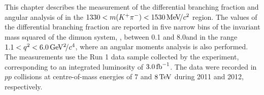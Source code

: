 This chapter describes the measurement of the differential branching fraction and angular analysis of \BdToKpimm in the $1330<m({{K}^+}{{\pi}^-})<1530{\mathrm{\,Me\kern -0.1em V\!/}c^2}$ region. The values of the differential branching fraction are reported in five narrow bins of the invariant mass squared of the dimuon system, \qsq, between 0.1 and 8.0\gevgevcccc and in the range $1.1<{q^2}<6.0{\mathrm{\,Ge\kern -0.1em V^2\!/}c^4}$,  where an angular moments analysis is also performed. The measurements use the Run 1 data sample collected by the \lhcb experiment, corresponding to an integrated luminosity of $3.0\mbox{\,fb}^{-1}$. The data were recorded in $pp$ collisions at centre-of-mass energies of $7$ and $8\mathrm{\,Te\kern -0.1em V}$ during 2011 and 2012, respectively. 